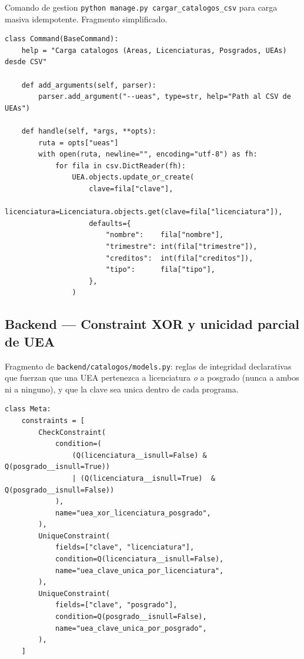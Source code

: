Comando de gestion \texttt{python manage.py cargar\_catalogos\_csv} para carga masiva idempotente. Fragmento simplificado.

\begin{Verbatim}[fontsize=\small, frame=single]
class Command(BaseCommand):
    help = "Carga catalogos (Areas, Licenciaturas, Posgrados, UEAs) desde CSV"

    def add_arguments(self, parser):
        parser.add_argument("--ueas", type=str, help="Path al CSV de UEAs")

    def handle(self, *args, **opts):
        ruta = opts["ueas"]
        with open(ruta, newline="", encoding="utf-8") as fh:
            for fila in csv.DictReader(fh):
                UEA.objects.update_or_create(
                    clave=fila["clave"],
                    licenciatura=Licenciatura.objects.get(clave=fila["licenciatura"]),
                    defaults={
                        "nombre":    fila["nombre"],
                        "trimestre": int(fila["trimestre"]),
                        "creditos":  int(fila["creditos"]),
                        "tipo":      fila["tipo"],
                    },
                )
\end{Verbatim}

\subsection{Backend --- Constraint XOR y unicidad parcial de UEA}\label{lst:uea_constraints}

Fragmento de \texttt{backend/catalogos/models.py}: reglas de integridad declarativas que fuerzan que una UEA pertenezca a licenciatura \emph{o} a posgrado (nunca a ambos ni a ninguno), y que la clave sea unica dentro de cada programa.

\begin{Verbatim}[fontsize=\small, frame=single]
class Meta:
    constraints = [
        CheckConstraint(
            condition=(
                (Q(licenciatura__isnull=False) & Q(posgrado__isnull=True))
                | (Q(licenciatura__isnull=True)  & Q(posgrado__isnull=False))
            ),
            name="uea_xor_licenciatura_posgrado",
        ),
        UniqueConstraint(
            fields=["clave", "licenciatura"],
            condition=Q(licenciatura__isnull=False),
            name="uea_clave_unica_por_licenciatura",
        ),
        UniqueConstraint(
            fields=["clave", "posgrado"],
            condition=Q(posgrado__isnull=False),
            name="uea_clave_unica_por_posgrado",
        ),
    ]
\end{Verbatim}

